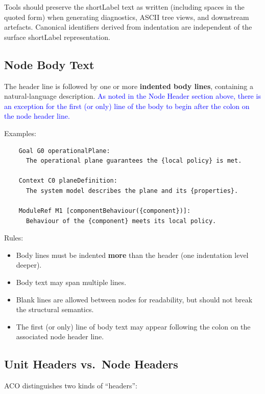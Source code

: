 \documentclass[11pt,twoside,a4paper]{article}
\begin{document}
Tools should preserve the shortLabel text as written (including spaces in the quoted form) when generating diagnostics, ASCII tree views, and downstream artefacts. Canonical identifiers derived from indentation are independent of the surface shortLabel representation.

\subsection{Node Body Text}

The header line is followed by one or more \textbf{indented body lines}, containing a natural-language description. \textcolor{blue}{As noted in the Node Header section above, there is an exception for the first (or only) line of the body to begin after the colon on the node header line.}

Examples:
\begin{verbatim}
    Goal G0 operationalPlane:
      The operational plane guarantees the {local policy} is met.

    Context C0 planeDefinition:
      The system model describes the plane and its {properties}.

    ModuleRef M1 [componentBehaviour({component})]:
      Behaviour of the {component} meets its local policy.
\end{verbatim}

Rules:
\begin{itemize}[leftmargin=2em]
  \item Body lines must be indented \textbf{more} than the header (one indentation level deeper).
  \item Body text may span multiple lines.
  \item Blank lines are allowed between nodes for readability, but should not break the structural semantics.
  \item The first (or only) line of body text may appear following the colon on the associated node header line.
\end{itemize}

\subsection{Unit Headers vs.\ Node Headers}
ACO distinguishes two kinds of ``headers'':
\end{document}
